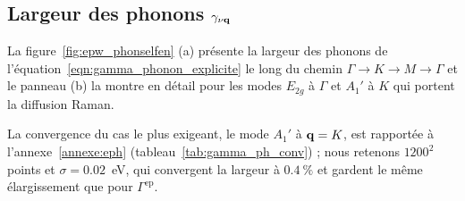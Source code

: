 \subsection{Largeur des phonons $\gamma_{\nu\mathbf{q}}$}\label{ssec:g_gamma_ph}

La figure~\ref{fig:epw_phonselfen} (a) présente la largeur des phonons de l'équation~\eqref{eqn:gamma_phonon_explicite} le long du chemin $\Gamma\to K\to M\to\Gamma$ et le panneau (b) la montre en détail pour les modes $E_{2g}$ à $\Gamma$ et $A_1'$ à $K$ qui portent la diffusion Raman.

La convergence du cas le plus exigeant, le mode $A_1'$ à $\mathbf{q}=K$, est rapportée à l'annexe~\ref{annexe:eph} (tableau~\ref{tab:gamma_ph_conv}) ; nous retenons $1200^2$ points et $\sigma=0.02$~eV, qui convergent la largeur à $0.4~\%$ et gardent le même élargissement que pour $\Gamma^\text{ep}$.

